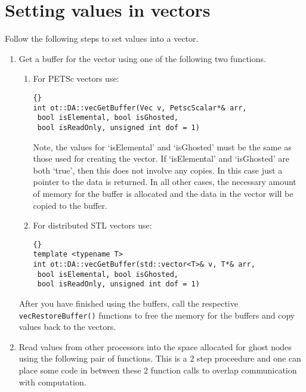 \documentclass[10pt,reqno,a4paper]{report}
\numberwithin{equation}{section}
\begin{document}
\section{Setting values in vectors}
\label{sec:vecbuffers}
Follow the following steps to set values into a vector.

\begin{enumerate}

\item Get a buffer for the vector using one of the following two functions.

\begin{enumerate}

\item For PETSc vectors use: 

\begin{lstlisting}[frame=trbl, fontadjust]{}
int ot::DA::vecGetBuffer(Vec v, PetscScalar*& arr, 
 bool isElemental, bool isGhosted,
 bool isReadOnly, unsigned int dof = 1)
\end{lstlisting}

Note, the values for `isElemental' and `isGhosted' must be the same as those used for creating the vector. 
If `isElemental' and `isGhosted' are both `true', then this does not involve any copies. In this case
 just a pointer to the data is returned. In all other cases, the necessary amount of memory for the buffer
 is allocated and the data in the vector will be copied to the buffer. 

\item For distributed STL vectors use:

\begin{lstlisting}[frame=trbl, fontadjust]{}
template <typename T>
int ot::DA::vecGetBuffer(std::vector<T>& v, T*& arr,
 bool isElemental, bool isGhosted,
 bool isReadOnly, unsigned int dof = 1)
\end{lstlisting}

\end{enumerate}

After you have finished using the buffers, call the respective \lstinline[basicstyle=\bfseries]!vecRestoreBuffer()! functions to free the memory for the buffers and copy values back to the vectors.

\item Read values from other processors into the space allocated for ghost nodes using the following pair of functions. This is a 2 step proceedure and one can place some code in between these 2 function calls to overlap communication with computation. 


\end{enumerate}
\end{document}
